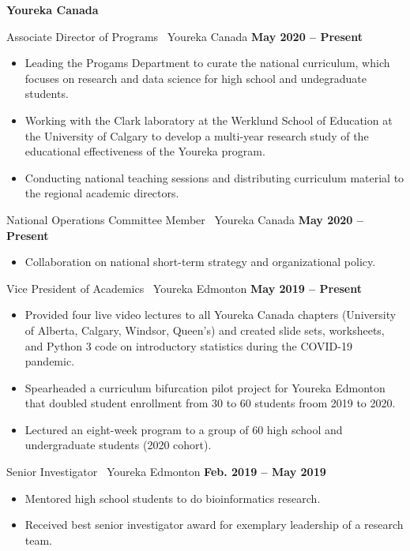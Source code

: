 \documentclass{article}
\begin{document}
    \textbf{Youreka Canada}

    Associate Director of Programs \textbar\ Youreka Canada \hfill \textbf{May 2020 -- Present}
    \begin{itemize}
        \item Leading the Progams Department to curate the national curriculum, which focuses on research and data science for high school and undegraduate students.
        \item Working with the Clark laboratory at the Werklund School of Education at the University of Calgary to develop a multi-year research study of the educational effectiveness of the Youreka program.
        \item Conducting national teaching sessions and distributing curriculum material to the regional academic directors.
    \end{itemize}

    National Operations Committee Member \textbar\ Youreka Canada \hfill \textbf{May 2020 -- Present}
    \begin{itemize}
        \item Collaboration on national short-term strategy and organizational policy.
    \end{itemize}

    Vice President of Academics \textbar\ Youreka Edmonton \hfill \textbf{May 2019 -- Present}
    \begin{itemize}
        \item Provided four live video lectures to all Youreka Canada chapters (University of Alberta, Calgary, Windsor, Queen's) and created slide sets, worksheets, and Python 3 code on introductory statistics during the COVID-19 pandemic.
        \item Spearheaded a curriculum bifurcation pilot project for Youreka Edmonton that doubled student enrollment from 30 to 60 students froom 2019 to 2020.
        \item Lectured an eight-week program to a group of 60 high school and undergraduate students (2020 cohort).
    \end{itemize}

    Senior Investigator \textbar\ Youreka Edmonton \hfill \textbf{Feb. 2019 -- May 2019}
    \begin{itemize}
        \item Mentored high school students to do bioinformatics research.
        \item Received best senior investigator award for exemplary leadership of a research team.
    \end{itemize}
\end{document}

